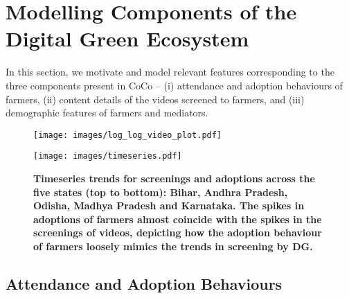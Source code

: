 \documentclass[manuscript,screen]{acmart}
\begin{document}


\section{Modelling Components of the Digital Green Ecosystem} \label{modelling_components}

In this section, we motivate and model relevant features corresponding to the three components present in CoCo -- (i) attendance and adoption behaviours of farmers, (ii) content details of the videos screened to farmers, and (iii) demographic features of farmers and mediators.

\begin{figure}[tp!]
\centering
\begin{minipage}{.45\textwidth}
  \centering
  \texttt{[image: images/log\_log\_video\_plot.pdf]}
  \label{fig:3}
\end{minipage}
\hfill
\begin{minipage}{.45\textwidth}
  \centering
    \texttt{[image: images/timeseries.pdf]}
    \caption{\textbf{\textbf{Timeseries trends for screenings and adoptions across the five states (top to bottom): Bihar, Andhra Pradesh, Odisha, Madhya Pradesh and Karnataka. The spikes in adoptions of farmers almost coincide with the spikes in the screenings of videos, depicting how the adoption behaviour of farmers loosely mimics the trends in screening by DG.}}}
    \label{fig:4}
\end{minipage}%
\end{figure}

\subsection{Attendance and Adoption Behaviours} \label{attendance_adoption_features}
\end{document}
